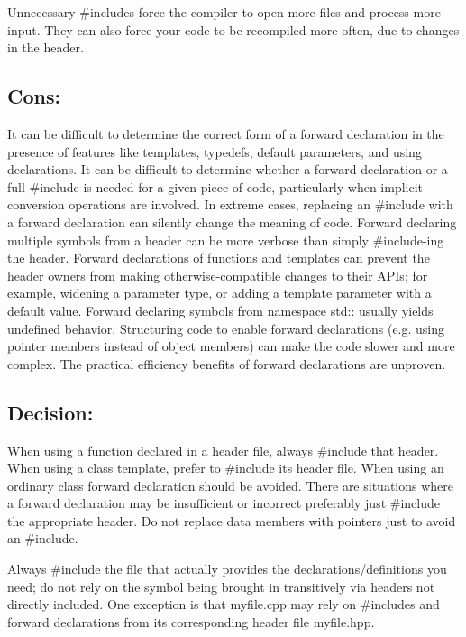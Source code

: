 \documentclass[11pt]{report}
\begin{document}
Unnecessary \#includes force the compiler to open more files and process more input.
    They can also force your code to be recompiled more often, due to changes in the header.

\subsection{Cons:}

    It can be difficult to determine the correct form of a forward declaration in the presence of features like templates, typedefs, default parameters, and using declarations.
    It can be difficult to determine whether a forward declaration or a full \#include is needed for a given piece of code, particularly when implicit conversion operations are involved. In extreme cases, replacing an \#include with a forward declaration can silently change the meaning of code.
    Forward declaring multiple symbols from a header can be more verbose than simply \#include-ing the header.
    Forward declarations of functions and templates can prevent the header owners from making otherwise-compatible changes to their APIs; for example, widening a parameter type, or adding a template parameter with a default value.
    Forward declaring symbols from namespace std:: usually yields undefined behavior.
    Structuring code to enable forward declarations (e.g. using pointer members instead of object members) can make the code slower and more complex.
    The practical efficiency benefits of forward declarations are unproven.

\subsection{Decision:}

    When using a function declared in a header file, always \#include that header.
    When using a class template, prefer to \#include its header file.
    When using an ordinary class forward declaration should be avoided. There are situations where a forward declaration may be insufficient or incorrect preferably just \#include the appropriate header.
    Do not replace data members with pointers just to avoid an \#include.

Always \#include the file that actually provides the declarations/definitions you need; do not rely on the symbol being brought in transitively via headers not directly included. One exception is that myfile.cpp may rely on \#includes and forward declarations from its corresponding header file myfile.hpp.
\end{document}
